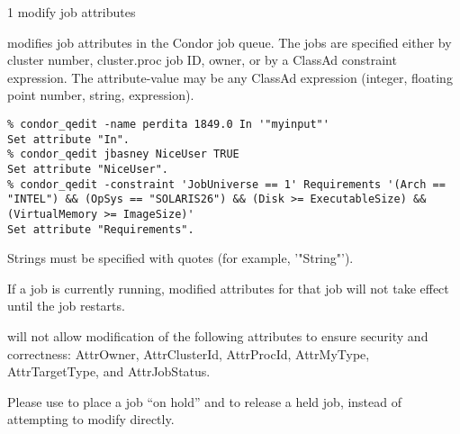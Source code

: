 \begin{ManPage}{\label{man-condor-qedit}}{1}
{modify job attributes}
\Synopsis {}
\Arg{\Dots}


\Description

 modifies job attributes in the Condor job queue.  The
jobs are specified either by cluster number, cluster.proc job ID,
owner, or by a ClassAd constraint expression.  The attribute-value may
be any ClassAd expression (integer, floating point number, string,
expression).

\begin{Options}
\end{Options}

\begin{Examples}
\begin{verbatim}
% condor_qedit -name perdita 1849.0 In '"myinput"'
Set attribute "In".
% condor_qedit jbasney NiceUser TRUE
Set attribute "NiceUser".
% condor_qedit -constraint 'JobUniverse == 1' Requirements '(Arch == "INTEL") && (OpSys == "SOLARIS26") && (Disk >= ExecutableSize) && (VirtualMemory >= ImageSize)'
Set attribute "Requirements".
\end{verbatim}
\end{Examples}

\begin{GenRem}
Strings must be specified with quotes (for example, '"String"').

If a job is currently running, modified attributes for that job will
not take effect until the job restarts.

 will not allow modification of the following
attributes to ensure security and correctness: Attr{Owner},
Attr{ClusterId}, Attr{ProcId}, Attr{MyType}, Attr{TargetType}, and
Attr{JobStatus}.

Please use  to place a job ``on hold'' and
 to release a held job, instead of attempting to
modify  directly.
\end{GenRem}

\end{ManPage}
